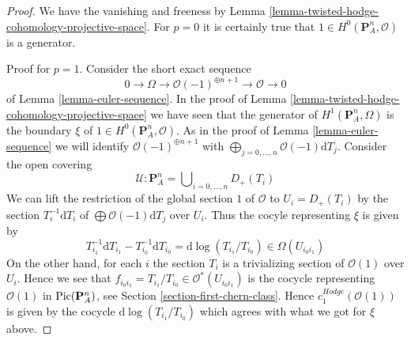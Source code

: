 \begin{proof}
We have the vanishing and freeness by
Lemma \ref{lemma-twisted-hodge-cohomology-projective-space}.
For $p = 0$ it is certainly true that
$1 \in H^0(\mathbf{P}^n_A, \mathcal{O})$ is a generator.

\medskip\noindent
Proof for $p = 1$. Consider the short exact sequence
$$
0 \to \Omega \to \mathcal{O}(-1)^{\oplus n + 1} \to \mathcal{O} \to 0
$$
of Lemma \ref{lemma-euler-sequence}. In the proof of
Lemma \ref{lemma-twisted-hodge-cohomology-projective-space}
we have seen that the generator of $H^1(\mathbf{P}^n_A, \Omega)$
is the boundary $\xi$ of $1 \in H^0(\mathbf{P}^n_A, \mathcal{O})$.
As in the proof of Lemma \ref{lemma-euler-sequence} we will identify
$\mathcal{O}(-1)^{\oplus n + 1}$ with
$\bigoplus_{j = 0, \ldots, n} \mathcal{O}(-1)\text{d}T_j$.
Consider the open covering
$$
\mathcal{U} : 
\mathbf{P}^n_A =
\bigcup\nolimits_{i = 0, \ldots, n} D_{+}(T_i)
$$
We can lift the restriction of the global section $1$ of $\mathcal{O}$
to $U_i = D_+(T_i)$ by the section $T_i^{-1} \text{d}T_i$ of
$\bigoplus \mathcal{O}(-1)\text{d}T_j$ over $U_i$. Thus the cocyle
representing $\xi$ is given by
$$
T_{i_1}^{-1} \text{d}T_{i_1} - T_{i_0}^{-1} \text{d}T_{i_0} =
\text{d}\log(T_{i_1}/T_{i_0}) \in \Omega(U_{i_0i_1})
$$
On the other hand, for each $i$ the section $T_i$ is a trivializing
section of $\mathcal{O}(1)$ over $U_i$. Hence we see that
$f_{i_0i_1} = T_{i_1}/T_{i_0} \in \mathcal{O}^*(U_{i_0i_1})$
is the cocycle representing $\mathcal{O}(1)$ in $\mathop{\mathrm{Pic}}\nolimits(\mathbf{P}^n_A)$,
see Section \ref{section-first-chern-class}.
Hence $c_1^{Hodge}(\mathcal{O}(1))$
is given by the cocycle $\text{d}\log(T_{i_1}/T_{i_0})$
which agrees with what we got for $\xi$ above.


\end{proof}
